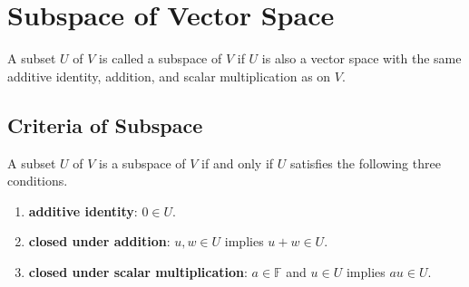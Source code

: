 \section{Subspace of Vector Space}
\begin{definition}[Subspace]
    A subset $U$ of $V$ is called a subspace of $V$ if $U$ is also a vector space with the same additive identity, addition, and scalar multiplication as on $V$.
\end{definition}
\subsection{Criteria of Subspace}
\begin{proposition}
    A subset $U$ of $V$ is a subspace of $V$ if and only if $U$ satisfies the following three conditions.

\begin{enumerate}
    \item \textbf{additive identity}: $0 \in U$.
    \item \textbf{closed under addition}: $u, w \in U$ implies $u+w \in U$.
    \item \textbf{closed under scalar multiplication}: $a \in \mathbb{F}$ and $u \in U$ implies $a u \in U$.
\end{enumerate}

\end{proposition}

